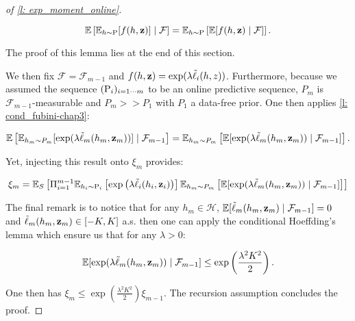 \begin{proof}[of \cref{l: exp_moment_online}]
\begin{lemma}
  \[ \mathbb{E}\left[\mathbb{E}_{h\sim \P} [f(h,\z)] \mid \mathcal{F} \right] =  \mathbb{E}_{h\sim \P} \left[ \mathbb{E}[f(h,\z)\mid \mathcal{F}] \right].    \]
\end{lemma}

\noindent The proof of this lemma lies at the end of this section.

\noindent We then fix $\mathcal{F}= \mathcal{F}_{m-1}$ and $f(h,\z)= \exp(\lambda\Tilde{\ell}_i(h,z))$. Furthermore, because we assumed the sequence $(\P_{i})_{i=1\cdots m}$ to be an online predictive sequence, $P_m$ is $\mathcal{F}_{m-1}$-measurable and $P_m>>P_1$ with $P_1$ a data-free prior. One then applies \cref{l: cond_fubini-chap3}:

\[ \mathbb{E}
\left[ \mathbb{E}_{h_m\sim P_m} [\exp(\lambda \Tilde{\ell}_m(h_m,\z_m))] \mid \mathcal{F}_{m-1} \right] =  \mathbb{E}_{h_m\sim P_m} \left[ \mathbb{E}
[\exp(\lambda \Tilde{\ell}_m(h_m,\z_m)) \mid \mathcal{F}_{m-1}] \right] . \]

\noindent Yet, injecting this result onto $\xi_m$ provides:

\begin{align*}
  \xi_m = \mathbb{E}_S\left[ \Pi_{i=1}^{m-1}\mathbb{E}_{h_i \sim \P_{i}} \left[\exp\left(\lambda  \Tilde{\ell}_i(h_i,\z_i)\right)\right] \mathbb{E}_{h_m\sim P_m} \left[ \mathbb{E}
  [\exp(\lambda \Tilde{\ell}_m(h_m,\z_m)) \mid \mathcal{F}_{m-1}] \right] \right]
\end{align*}

The final remark is to notice that for any $h_m\in\mathcal{H}$, $\mathbb{E}[\Tilde{\ell}_m(h_m,\z_m)\mid \mathcal{F}_{m-1}] = 0$ and $\Tilde{\ell}_m(h_m,\z_m)\in [-K,K]$ a.s. then one can apply the conditional Hoeffding's lemma which ensure us that for any $\lambda>0$:

\[ \mathbb{E}
[\exp(\lambda \Tilde{\ell}_m(h_m,\z_m)) \mid \mathcal{F}_{m-1}] \leq \exp\left( \frac{\lambda^2K^2}{2}   \right). \]

One then has $\xi_m \leq \exp\left( \frac{\lambda^2K^2}{2}   \right) \xi_{m-1}$. The recursion assumption concludes the proof.


\end{proof}



